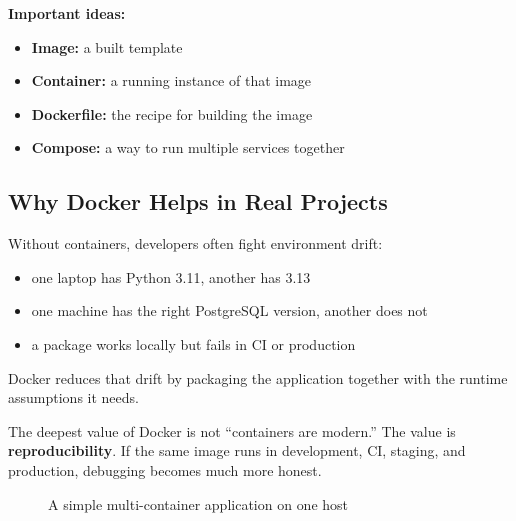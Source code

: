 \documentclass[12pt, a4paper, oneside]{book}
\begin{document}
\textbf{Important ideas:}
\begin{itemize}[leftmargin=2em]
    \item \textbf{Image:} a built template
    \item \textbf{Container:} a running instance of that image
    \item \textbf{Dockerfile:} the recipe for building the image
    \item \textbf{Compose:} a way to run multiple services together
\end{itemize}

\subsection{Why Docker Helps in Real Projects}

Without containers, developers often fight environment drift:
\begin{itemize}[leftmargin=2em]
    \item one laptop has Python 3.11, another has 3.13
    \item one machine has the right PostgreSQL version, another does not
    \item a package works locally but fails in CI or production
\end{itemize}

Docker reduces that drift by packaging the application together with the runtime assumptions it needs.

\begin{intuitionbox}
The deepest value of Docker is not ``containers are modern.'' The value is \textbf{reproducibility}. If the same image runs in development, CI, staging, and production, debugging becomes much more honest.
\end{intuitionbox}

\begin{figure}[H]
\centering
{}
\caption{A simple multi-container application on one host}
\label{fig:docker-layout}
\end{figure}
\end{document}
